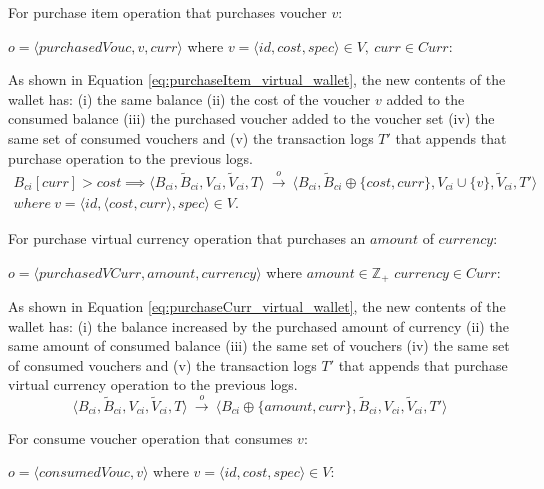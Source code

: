 \begin{enumerate}
	For purchase item operation that purchases voucher $v$:
	\begin{center}
		$o = \langle purchasedVouc, v, curr \rangle$ where $v=\langle id, cost, spec \rangle \in V, ~ curr \in Curr$:
	\end{center}

	
	As shown in Equation \ref{eq:purchaseItem_virtual_wallet}, the new contents of the wallet has: (i) the same balance (ii) the cost of the voucher $v$ added to the consumed balance (iii) the purchased voucher added to the voucher set (iv) the same set of consumed vouchers and (v) the transaction logs $T'$ that appends that purchase operation to the previous logs.	
	\begin{multline} \label{eq:purchaseItem_virtual_wallet}
		 B_{ci}[curr] > cost \implies \langle B_{ci}, \widetilde{B}_{ci}, V_{ci}, \widetilde{V}_{ci}, T \rangle ~ \overset{o}{\rightarrow} 
	    ~ \langle B_{ci}, \widetilde{B}_{ci} \oplus \{cost, curr\}, V_{ci} \cup \{v\}, \widetilde{V}_{ci}, T' \rangle \\
	    where ~ v = \langle id, \langle cost, curr \rangle, spec \rangle \in V.
	\end{multline}
	
	For purchase virtual currency operation that purchases an $amount$ of $currency$:
	\begin{center}
	$o = \langle purchasedVCurr, amount, currency \rangle$  where $amount \in \mathbb{Z}_{+}$  $currency \in Curr$:
	\end{center}
	
	As shown in Equation \ref{eq:purchaseCurr_virtual_wallet}, the new contents of the wallet has: (i) the balance increased by the purchased amount of currency (ii) the same amount of consumed balance (iii) the same set of vouchers (iv) the same set of consumed vouchers and (v) the transaction logs $T'$ that appends that purchase virtual currency operation to the previous logs.	
	\begin{equation} \label{eq:purchaseCurr_virtual_wallet}
	    \langle B_{ci}, \widetilde{B}_{ci}, V_{ci}, \widetilde{V}_{ci}, T \rangle ~ \overset{o}{\rightarrow}
	    ~ \langle B_{ci} \oplus \{amount, curr\}, \widetilde{B}_{ci}, V_{ci}, \widetilde{V}_{ci}, T' \rangle
	\end{equation}
	
	For consume voucher operation that consumes $v$:
	\begin{center}
		$o = \langle consumedVouc, v \rangle$ where $v=\langle id, cost, spec \rangle  \in V$:
	\end{center}
	

\end{enumerate}
